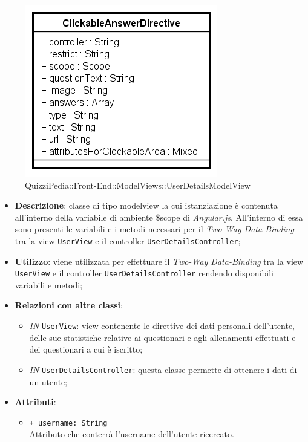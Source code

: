 		\begin{figure}[ht]
			\centering
			\includegraphics[scale=0.5,keepaspectratio]{UML/Classi/Front-End/QuizziPedia_Front-end_Templates_ClickableAnswerTemplate.png}
			\caption{QuizziPedia::Front-End::ModelViews::UserDetailsModelView}
		\end{figure} \FloatBarrier
		
		\begin{itemize}
			\item \textbf{Descrizione}: classe di tipo modelview la cui istanziazione è contenuta all'interno della variabile di ambiente \$scope di \textit{Angular.js}. All'interno di essa sono presenti le variabili e i metodi necessari per il \textit{Two-Way Data-Binding} tra la view \texttt{UserView} e il controller \texttt{UserDetailsController};
			\item \textbf{Utilizzo}: viene utilizzata per effettuare il \textit{Two-Way Data-Binding} tra la view \texttt{UserView} e il controller \texttt{UserDetailsController} rendendo disponibili variabili e metodi;
			\item \textbf{Relazioni con altre classi}: 
			\begin{itemize}
				\item \textit{IN} \texttt{UserView}: view contenente le direttive dei dati personali dell'utente, delle sue statistiche relative ai questionari e agli allenamenti effettuati e dei questionari a cui è iscritto; 
				\item \textit{IN} \texttt{UserDetailsController}: questa classe permette di ottenere i dati di un utente;
			\end{itemize}
			\item \textbf{Attributi}: 
			\begin{itemize}
				\item \texttt{+ username: String} \\ Attributo che conterrà l'username dell'utente ricercato.
			\end{itemize}
		\end{itemize}
		
